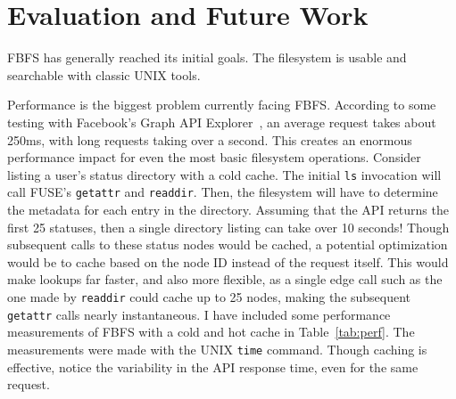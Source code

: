 \documentclass[11pt,twocolumn]{article}
\begin{document}
\section{Evaluation and Future Work}

FBFS has generally reached its initial goals. The filesystem is
usable and searchable with classic UNIX tools.

Performance is the biggest problem currently facing FBFS\@. According to some
testing with Facebook's Graph API Explorer~\cite{graphapiexplorer}, an average
request takes about 250ms, with long requests taking over a second. This
creates an enormous performance impact for even the most basic filesystem
operations. Consider listing a user's status directory with a cold cache. The
initial \texttt{ls} invocation will call FUSE's \texttt{getattr} and
\texttt{readdir}. Then, the filesystem will have to determine the metadata for
each entry in the directory. Assuming that the API returns the first 25
statuses, then a single directory listing can take over 10 seconds! Though
subsequent calls to these status nodes would be cached, a potential
optimization would be to cache based on the node ID instead of the request
itself. This would make lookups far faster, and also more flexible, as a single
edge call such as the one made by \texttt{readdir} could cache up to 25 nodes,
making the subsequent \texttt{getattr} calls nearly instantaneous. I have
included some performance measurements of FBFS with a cold and hot cache in
Table~\ref{tab:perf}. The measurements were made with the UNIX \texttt{time}
command. Though caching is effective, notice the variability in the API
response time, even for the same request.
\end{document}
